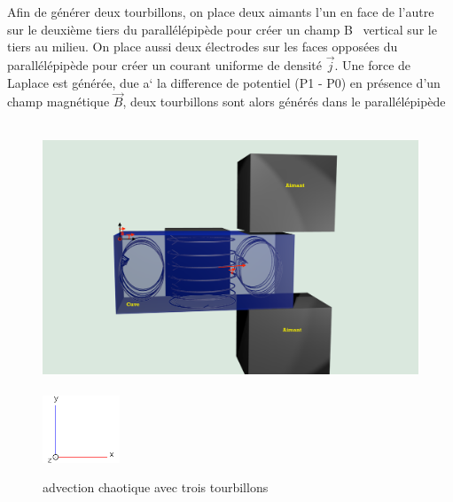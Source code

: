\documentclass[a4paper,12pt,titlepage]{report}
\begin{document}
\begin{onehalfspace}
Afin de générer deux tourbillons, on place deux aimants l’un en face de l’autre sur le deuxième tiers du parallélépipède pour créer un champ B~ vertical sur le tiers au milieu.
On place aussi deux électrodes sur les faces opposées du parallélépipède pour créer un courant uniforme de densité $\vec{j}$.
Une force de Laplace est générée, due a` la difference de potentiel (P1 - P0) en présence d’un champ magnétique $\vec{B}$, deux tourbillons sont alors générés dans le parallélépipède


\begin{figure}[!h]
\begin{center}
\includegraphics[height = 8cm, keepaspectratio]{graphes/blender_cuve_champvec3.png} 
\includegraphics[height = 2cm, keepaspectratio]{graphes/axes.png}
\caption{advection chaotique avec trois tourbillons}
\end{center}
\end{figure}


\newpage

\end{onehalfspace}
\end{document}
